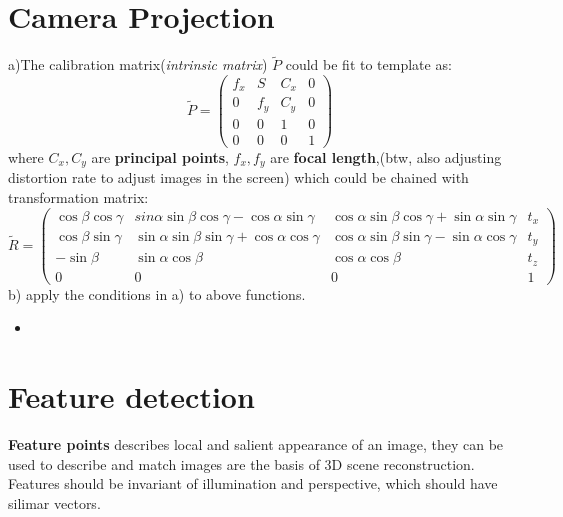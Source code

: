 \documentclass{article}
\begin{document}
\section*{Camera Projection}
a)The calibration matrix(\textit{intrinsic matrix}) $\tilde{P}$ could be fit to template as:
\begin{equation*}
	\tilde{P} = 
	\begin{pmatrix}
		f_{x} & S & C_{x} & 0 \\
		0 & f_{y} & C_{y} & 0 \\
		0 & 0 & 1 & 0 \\
		0 & 0 & 0 & 1
	\end{pmatrix}
\end{equation*}
where $C_{x}, C_{y}$ are \textbf{principal points}, $f_{x}, f_{y} $ are \textbf{focal length},(btw, also adjusting distortion rate to adjust images in the screen) which could be chained with transformation matrix:
\begin{equation*}
	\tilde{R} = 
	\begin{pmatrix}
		\cos\beta\cos\gamma & sin\alpha\sin\beta\cos\gamma - \cos\alpha\sin\gamma & \cos\alpha\sin\beta\cos\gamma + \sin\alpha\sin\gamma &t_{x} \\
		\cos\beta\sin\gamma & \sin\alpha\sin\beta\sin\gamma+\cos\alpha\cos\gamma & \cos\alpha\sin\beta\sin\gamma - \sin\alpha\cos\gamma &t_{y}  \\
		-\sin\beta & \sin\alpha\cos\beta & \cos\alpha\cos\beta & t_{z} \\
		0 & 0 & 0 & 1
	\end{pmatrix}
\end{equation*} 
b) apply the conditions in a) to above functions.

\begin{itemize}
	\item 
\end{itemize}

\section{Feature detection}
\textbf{Feature points} describes local and salient appearance of an image, they can be used to describe and match images are the basis of 3D scene reconstruction.\\
Features should be invariant of illumination and perspective, which should have silimar vectors.
\end{document}
